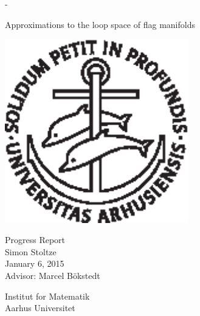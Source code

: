 \begin{titlingpage}
  \calccentering{\unitlength}
  \begin{adjustwidth*}{\unitlength}{-\unitlength}
    \begin{adjustwidth}{-1cm}{-1cm} 
      \vspace*{2cm}
      \centering
      \scshape
      
      {\Huge Approximations to the loop space of \newline\newline flag
        manifolds} \\
      
      \vspace*{3\onelineskip}
      
      \includegraphics[width=8cm]{segla1s.ps}    
      
      \vspace*{3\onelineskip}
      
      {\large
        \linespread{1.4}\selectfont
        Progress Report\\
        Simon Stoltze\\
        January 6, 2015\\
        Advisor: Marcel B\"okstedt\\ }
      
      \strut\vfill
      Institut for Matematik \\
      Aarhus Universitet
    \end{adjustwidth}
  \end{adjustwidth*}
  
\end{titlingpage}


